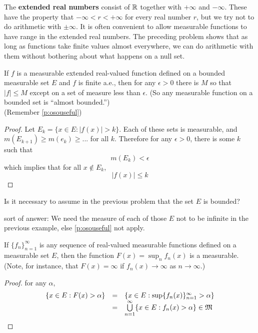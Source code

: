 \begin{defn}\label{d:extendedreals}%
	The \textbf{extended real numbers} consist of $\mathbb{R}$ together with $+\infty$ 
	and $-\infty$. These have the property that $-\infty < r < +\infty$ for 
	every real number $r$, but we try not to do arithmetic with $\pm\infty$. It 
	is often convenient to allow measurable functions to have range in the 
	extended real numbers. The preceding problem shows that as long as 
	functions take finite values almost everywhere, we can do arithmetic with 
	them without bothering about what happens on a null set. 
\end{defn}

\begin{pblm}%
	If $f$ is a measurable extended real-valued function defined on a bounded 
	measurable set $E$ and $f$ is finite a.e., then for any $\epsilon > 0$ 
	there is $M$ so that $|f| \le M$ except on a set of measure less than 
	$\epsilon$. (So any measurable function on a bounded set is ``almost 
	bounded.'') \\ (Remember \ref{p:osouseful})
\begin{proof}
	Let $E_k = \{x \in E: |f(x)| > k\}$. Each of these sets is 
	measurable, and $m(E_{k+1}) \ge m(e_k) \ge ...$ for all $k$. Therefore 
	for any $\epsilon > 0$, there is some $k$ such that 
	\begin{equation*}
		m(E_k) < \epsilon
	\end{equation*}
	which implies that for all $x \notin E_k$, 
	\begin{equation*}
		|f(x)| \le k
	\end{equation*}
\end{proof}
\end{pblm}

\begin{pblm}%
	Is it necessary to assume in the previous problem that the set $E$ is 
	bounded? 

	sort of answer: We need the measure of each of those $E$ not to be infinite 
	in the previous example, else \ref{p:osouseful}  not apply. 
\end{pblm}

\begin{pblm}%
	If $\{f_n\}_{n=1}^\infty$ is any sequence of real-valued measurable 
	functions defined on a measurable set $E$, then the function 
	$F(x) = \sup_n f_n(x)$ is a measurable. (Note, for instance, that 
	$F(x) = \infty$ if $f_n(x) \rightarrow \infty$ as $n \rightarrow \infty$.)
\begin{proof}
	for any $\alpha$, 
	\begin{equation*}
	\begin{array}{rcl}
		\{x \in E: F(x) > \alpha\} &=& \{x \in E: \sup \{f_n(x)\}_{n=1}^\infty > \alpha\}\\
		&=& \bigcup\limits_{n=1}^\infty\{x\in E: f_n(x) > \alpha\} \in \mathfrak{M}
	\end{array}
	\end{equation*}
\end{proof}
\end{pblm}

